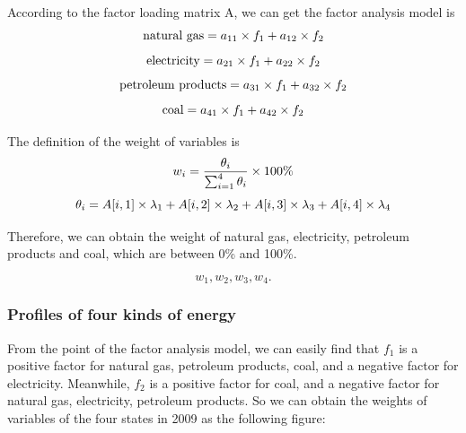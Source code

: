\documentclass[a4paper,11pt]{article}
\begin{document}
\par According to the factor loading matrix A, we can get the factor analysis model is
\begin{equation}
    \centering
    \text{natural gas}=a_{11} \times f_1+a_{12} \times f_2
\end{equation}
\begin{equation}
    \centering
    \text{electricity}=a_{21} \times f_1+a_{22} \times f_2
\end{equation}
\begin{equation}
    \centering
    \text{petroleum products}=a_{31} \times f_1+a_{32} \times f_2
\end{equation}
\begin{equation}
    \centering
    \text{coal}=a_{41} \times f_1+a_{42} \times f_2
\end{equation}
\par The definition of the weight of variables is\cite{5}
\begin{equation}
    \centering
w_i=\frac{ \theta_i }{ \sum_{i=1}^{4}\theta_i } \times 100\%
\end{equation}
\begin{equation}
    \centering
\theta_i=A[i,1] \times \lambda_1+A[i,2] \times \lambda_2+A[i,3] \times \lambda_3+A[i,4] \times \lambda_4
\end{equation}

\par Therefore, we can obtain the weight of natural gas, electricity, petroleum products and coal, which are between 0\% and 100\%.

\[
w_1, w_2, w_3, w_4.
\]

\subsubsection{Profiles of four kinds of energy}

\par From the point of the factor analysis model, we can easily find that $f_1$ is a positive factor for natural gas, petroleum products, coal, and a negative factor for electricity. Meanwhile, $f_2$ is a positive factor for coal, and a negative factor for natural gas, electricity, petroleum products. 
    So we can obtain the weights of variables of the four states in 2009 as the following figure:
\end{document}

